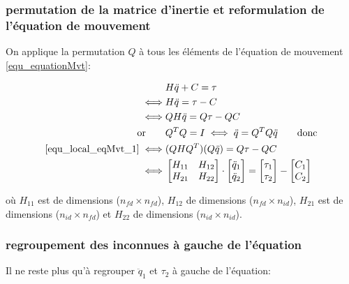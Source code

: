\documentclass{report}
\begin{document}

\subsubsection{permutation de la matrice d'inertie et reformulation de l'équation de mouvement}

On applique la permutation $Q$ à tous les éléments de l'équation de mouvement \eqref{equ_equationMvt}:
\begin{spacing}{1.5}
\begin{align}
&H \ddot{q} + C = \tau \notag \\
\iff &H \ddot{q} = \tau - C \notag \\
\iff &Q H \ddot{q} = Q \tau - Q C \label{equ_local_eqMvt_1} \\
\textnormal{or} \qquad &Q^T Q = I \iff \ddot{q} = Q^T Q \ddot{q} \qquad \textnormal{donc} \notag \\
\eqref{equ_local_eqMvt_1} \iff &(Q H Q^T) (Q \ddot{q}) = Q \tau - Q C \notag \\
\iff 
&\begin{bmatrix}
  H_{11} & H_{12} \\
  H_{21} & H_{22}
\end{bmatrix} 
\cdot
\begin{bmatrix}
  \ddot{q}_{1} \\
  \ddot{q}_{2}
\end{bmatrix} 
= 
\begin{bmatrix}
  \tau_{1} \\
  \tau_{2}
\end{bmatrix} 
-
\begin{bmatrix}
  C_{1} \\
  C_{2}
\end{bmatrix} \label{equ_local_eqMvt_2}
\end{align}
\end{spacing}

où $H_{11}$ est de dimensions ($n_{fd} \times n_{fd}$), $H_{12}$ de dimensions ($n_{fd} \times n_{id}$), $H_{21}$ est de dimensions ($n_{id} \times n_{fd}$) et $H_{22}$ de dimensions ($n_{id} \times n_{id}$).
\subsubsection{regroupement des inconnues à gauche de l'équation}

Il ne reste plus qu'à regrouper $\ddot{q}_1$ et $\tau_2$ à gauche de l'équation:
\end{document}
